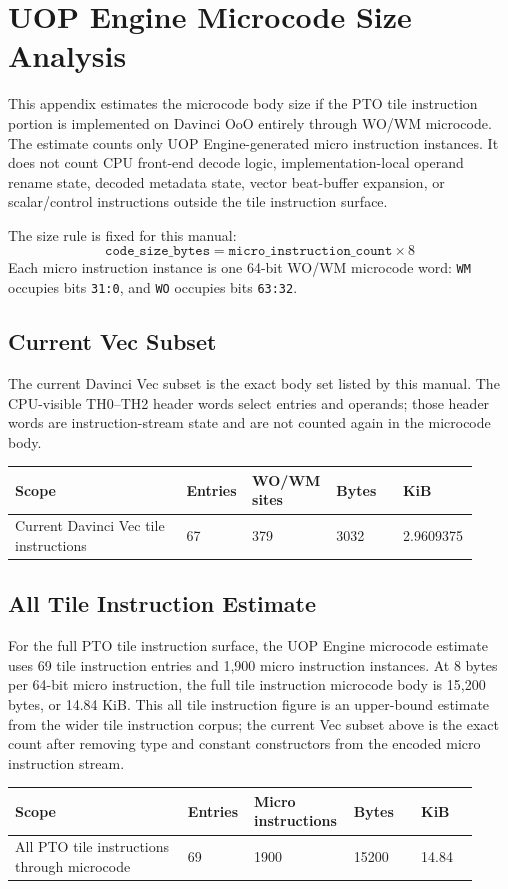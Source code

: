 \chapter{UOP Engine Microcode Size Analysis}
This appendix estimates the microcode body size if the PTO tile instruction portion is implemented on Davinci OoO entirely through WO/WM microcode. The estimate counts only UOP Engine-generated micro instruction instances. It does not count CPU front-end decode logic, implementation-local operand rename state, decoded metadata state, vector beat-buffer expansion, or scalar/control instructions outside the tile instruction surface.

The size rule is fixed for this manual:
\[
\texttt{code\_size\_bytes} = \texttt{micro\_instruction\_count} \times 8
\]
Each micro instruction instance is one 64-bit WO/WM microcode word: \texttt{WM} occupies bits \texttt{31:0}, and \texttt{WO} occupies bits \texttt{63:32}.

\section{Current Vec Subset}
The current Davinci Vec subset is the exact body set listed by this manual. The CPU-visible TH0--TH2 header words select entries and operands; those header words are instruction-stream state and are not counted again in the microcode body.
\begin{longtable}{@{}L{0.36\linewidth}R{0.12\linewidth}R{0.16\linewidth}R{0.14\linewidth}R{0.14\linewidth}@{}}
\toprule
Scope & Entries & WO/WM sites & Bytes & KiB \\
\midrule
Current Davinci Vec tile instructions & 67 & 379 & 3032 & 2.9609375 \\
\bottomrule
\end{longtable}

\section{All Tile Instruction Estimate}
For the full PTO tile instruction surface, the UOP Engine microcode estimate uses 69 tile instruction entries and 1,900 micro instruction instances. At 8 bytes per 64-bit micro instruction, the full tile instruction microcode body is 15,200 bytes, or 14.84 KiB. This all tile instruction figure is an upper-bound estimate from the wider tile instruction corpus; the current Vec subset above is the exact count after removing type and constant constructors from the encoded micro instruction stream.
\begin{longtable}{@{}L{0.36\linewidth}R{0.12\linewidth}R{0.18\linewidth}R{0.14\linewidth}R{0.12\linewidth}@{}}
\toprule
Scope & Entries & Micro instructions & Bytes & KiB \\
\midrule
All PTO tile instructions through microcode & 69 & 1900 & 15200 & 14.84 \\
\bottomrule
\end{longtable}

